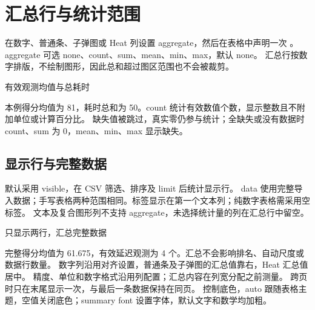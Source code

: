 \section{汇总行与统计范围}
\label{sec:summary}
在数字、普通条、子弹图或 Heat 列设置 aggregate，然后在表格中声明一次 。
aggregate 可选 none、count、sum、mean、min、max，默认 none。
汇总行按数字排版，不绘制图形，因此总和超过图区范围也不会被裁剪。
\begin{example}[text and listing,sidebyside=false]{有效观测均值与总耗时}
\begin{gradtable}[style=academic,theme=teal,width=\linewidth,header align=c]
\end{gradtable}
\end{example}
本例得分均值为 81，耗时总和为 50。count 统计有效数值个数，显示整数且不附加单位或计算百分比。
缺失值被跳过，真实零仍参与统计；全缺失或没有数据时 count、sum 为 0，mean、min、max 显示缺失。
\subsection{显示行与完整数据}
 默认采用 visible，在 CSV 筛选、排序及 limit 后统计显示行。
data 使用完整导入数据；手写表格两种范围相同。标签显示在第一个文本列；纯数字表格需采用空标签。
文本及复合图形列不支持 aggregate，未选择统计量的列在汇总行中留空。
\begin{example}[text and listing,sidebyside=false]{只显示两行，汇总完整数据}
\begin{gradtable}[style=compact,data=results,width=\linewidth,
  sort=score,order=descending,limit=2,header align=c]
\end{gradtable}
\end{example}
完整得分均值为 61.675，有效延迟观测为 4 个。汇总不会影响排名、自动尺度或数据行数量。
数字列沿用对齐设置，普通条及子弹图的汇总值靠右，Heat 汇总值居中。
精度、单位和数字格式沿用列配置；汇总内容在列宽分配之前测量。
跨页时只在末尾显示一次，与最后一条数据保持在同页。
 控制底色，auto 跟随表格主题，空值关闭底色；summary font 设置字体，默认文字和数学均加粗。


